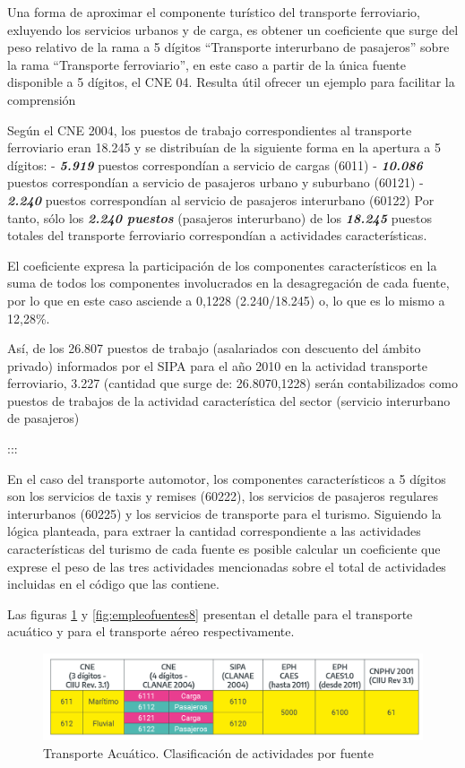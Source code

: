 \documentclass[
  openany]{book}
\begin{document}
Una forma de aproximar el componente turístico del transporte ferroviario, exluyendo los servicios urbanos y de carga, es obtener un coeficiente que surge del peso relativo de la rama a 5 dígitos ``Transporte interurbano de pasajeros'' sobre la rama ``Transporte ferroviario'', en este caso a partir de la única fuente disponible a 5 dígitos, el CNE 04.
Resulta útil ofrecer un ejemplo para facilitar la comprensión

Según el CNE 2004, los puestos de trabajo correspondientes al transporte ferroviario eran 18.245 y se distribuían de la siguiente forma en la apertura a 5 dígitos: - \textbf{\emph{5.919}} puestos correspondían a servicio de cargas (6011) - \textbf{\emph{10.086}} puestos correspondían a servicio de pasajeros urbano y suburbano (60121) - \textbf{\emph{2.240}} puestos correspondían al servicio de pasajeros interurbano (60122) Por tanto, sólo los \textbf{\emph{2.240 puestos}} (pasajeros interurbano) de los \textbf{\emph{18.245}} puestos totales del transporte ferroviario correspondían a actividades características.

El coeficiente expresa la participación de los componentes característicos en la suma de todos los componentes involucrados en la desagregación de cada fuente, por lo que en este caso asciende a 0,1228 (2.240/18.245) o, lo que es lo mismo a 12,28\%.

Así, de los 26.807 puestos de trabajo (asalariados con descuento del ámbito privado) informados por el SIPA para el año 2010 en la actividad transporte ferroviario, 3.227 (cantidad que surge de: 26.8070,1228) serán contabilizados como puestos de trabajos de la actividad característica del sector (servicio interurbano de pasajeros)

:::

En el caso del transporte automotor, los componentes característicos a 5 dígitos son los servicios de taxis y remises (60222), los servicios de pasajeros regulares interurbanos (60225) y los servicios de transporte para el turismo. Siguiendo la lógica planteada, para extraer la cantidad correspondiente a las actividades características del turismo de cada fuente es posible calcular un coeficiente que exprese el peso de las tres actividades mencionadas sobre el total de actividades incluidas en el código que las contiene.

Las figuras \ref{fig:empleofuentes7} y \ref{fig:empleofuentes8} presentan el detalle para el transporte acuático y para el transporte aéreo respectivamente.

\begin{figure}

{\centering \includegraphics[width=1\linewidth]{imagenes/figura3.7} 

}

\caption{Transporte Acuático. Clasificación de actividades por fuente}\label{fig:empleofuentes7}
\end{figure}
\end{document}
